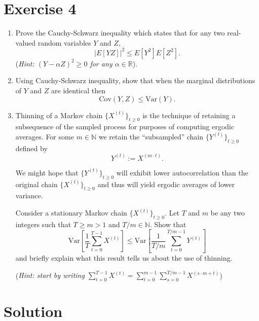 \section*{Exercise 4}
\begin{enumerate}
\item Prove the Cauchy-Schwarz inequality which states that for any two real-valued random variables $Y$ and $Z$,
\begin{equation*}
|E [Y Z]|^2 \leq E\left[Y^2\right] E\left[Z^2\right].
\end{equation*}
(\emph{Hint: $(Y - \alpha Z)^2 \geq 0$ for any $\alpha \in \mathbb{R}$}).

\item Using Cauchy-Schwarz inequality, show that when the marginal distributions of $Y$ and $Z$ are identical then
\begin{equation*}
\text{Cov} (Y, Z) \leq \text{Var} (Y).
\end{equation*}

\item Thinning of a Markov chain $\{X^{(t)}\}_{t\geq0}$ is the technique of retaining a subsequence of the sampled process for purposes of computing ergodic averages. For some $m \in \mathbb{N}$ we retain the ``subsampled'' chain $\{Y^{(t)}\}_{t\geq0}$ defined by
\begin{equation*}
Y^{(t)} := X^{(m \cdot t)}.
\end{equation*}

We might hope that $\{Y^{(t)}\}_{t\geq0}$ will exhibit lower autocorrelation than the original chain $\{X^{(t)}\}_{t\geq0}$ and thus will yield ergodic averages of lower variance.

Consider a stationary Markov chain $\{X^{(t)}\}_{t\geq0}$. Let $T$ and $m$ be any two integers such that $T \geq m > 1$ and $T/m \in \mathbb{N}$. Show that
\begin{equation*}
\text{Var}\left[\frac{1}{T}\sum_{t=0}^{T-1}X^{(t)}\right] \leq \text{Var}\left[\frac{1}{T/m}\sum_{t=0}^{T/m-1}Y^{(t)}\right]
\end{equation*}
and briefly explain what this result tells us about the use of thinning.

(\emph{Hint: start by writing $\sum_{t=0}^{T-1} X^{(t)} = \sum_{t=0}^{m-1}\sum_{s=0}^{T/m-1} X^{(s \cdot m+t)}$})
\end{enumerate}

\section*{Solution}


